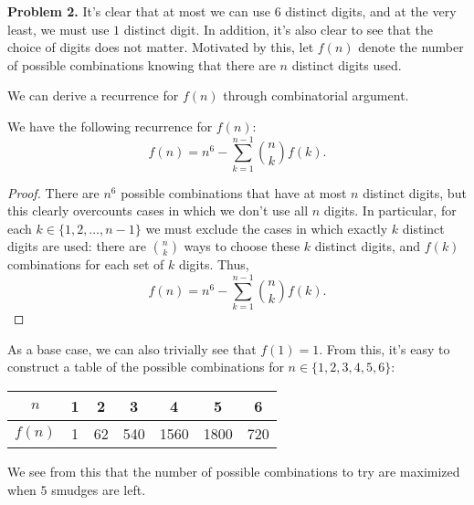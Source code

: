 \begin{solution}{2}
    \textbf{Problem 2.} It's clear that at most we can use \( 6 \) distinct digits, and at the very least, we must use \( 1 \) distinct digit. In addition, it's also clear to see that the choice of digits does not matter. Motivated by this, let \( f(n) \) denote the number of possible combinations knowing that there are \( n \) distinct digits used.

    We can derive a recurrence for \( f(n) \) through combinatorial argument.

    \begin{claim}
        We have the following recurrence for \( f(n) \):
        \[
            f(n) = n^6 - \sum_{k = 1}^{n - 1} \binom{n}{k} f(k)
        .\]
    \end{claim}

    \begin{proof}
        There are \( n^6 \) possible combinations that have at most \( n \)
        distinct digits, but this clearly overcounts cases in which we don't
        use all \( n \) digits. In particular, for each \( k \in \{1, 2,
        \ldots, n -1\} \) we must exclude the cases in which exactly \( k \)
        distinct digits are used: there are \( \binom{n}{k} \) ways to choose these \( k \) distinct digits, and \( f(k) \) combinations for each set of \( k \) digits. Thus,
        \[
            f(n) = n^6 - \sum_{k = 1}^{n - 1} \binom{n}{k} f(k)
        .\]
    \end{proof}

    As a base case, we can also trivially see that \( f(1) = 1 \). From this,
    it's easy to construct a table of the possible combinations for \( n \in
    \{1, 2, 3, 4, 5, 6\} \):

    \begin{center}
    \begin{tabular}{c|c|c|c|c|c|c}
        \( n \) & 1 & 2 & 3 & 4 & 5 & 6 \\
        \hline
        \( f(n) \) & 1 & 62 & 540 & 1560 & 1800 & 720
    \end{tabular}
    \end{center}

    We see from this that the number of possible combinations to try are maximized when \( \boxed{5} \) smudges are left.
\end{solution}
